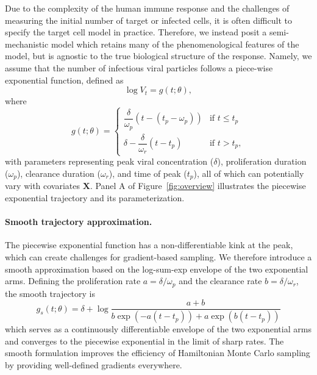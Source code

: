 \documentclass[12pt]{article}
\begin{document}
Due to the complexity of the human immune response and the challenges of measuring the initial number of target or infected cells, it is often difficult to specify the target cell model in practice. Therefore, we instead posit a semi-mechanistic model which retains many of the phenomenological features of the model, but is agnostic to the true biological structure of the response. Namely, we assume that the number of infectious viral particles follows a piece-wise exponential function, defined as
\begin{equation*}
    \log V_t = g(t; \theta),
\end{equation*}
where
\begin{equation*}
    g(t; \theta) = \begin{cases}
   \dfrac{\delta}{\omega_p} (t - (t_p - \omega_p)) & \text{if } t \leq t_p \\
    \delta - \dfrac{\delta}{\omega_r} (t - t_p) & \text{if } t > t_p,
\end{cases}
\end{equation*}
with parameters representing peak viral concentration ($\delta$), proliferation duration ($\omega_p$), clearance duration ($\omega_r$), and time of peak ($t_p$), all of which can potentially vary with covariates $\mathbf{X}$. Panel A of Figure~\ref{fig:overview} illustrates the piecewise exponential trajectory and its parameterization.

\paragraph{Smooth trajectory approximation.} The piecewise exponential function has a non-differentiable kink at the peak, which can create challenges for gradient-based sampling. We therefore introduce a smooth approximation based on the log-sum-exp envelope of the two exponential arms. Defining the proliferation rate $a = \delta / \omega_p$ and the clearance rate $b = \delta / \omega_r$, the smooth trajectory is
\begin{equation*}
    g_s(t; \theta) = \delta + \log \frac{a + b}{b \exp(-a(t - t_p)) + a \exp(b(t - t_p))}
\end{equation*}
which serves as a continuously differentiable envelope of the two exponential arms and converges to the piecewise exponential in the limit of sharp rates. The smooth formulation improves the efficiency of Hamiltonian Monte Carlo sampling by providing well-defined gradients everywhere.
\end{document}

